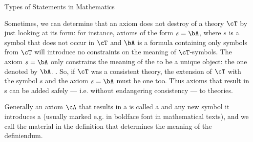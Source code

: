 \begin{omgroup}[id=statements-constitutive]{Types of Statements in Mathematics}
\begin{module}[id=statementtypes]
\begin{omtext}
  Sometimes, we can determine that an axiom does not destroy {} of a
  theory $\cT$ by just looking at its form: for instance, axioms of the form $s=\bA$,
  where $s$ is a symbol that does not occur in $\cT$ and $\bA$ is a formula containing
  only symbols from $\cT$ will introduce no constraints on the meaning of
  $\cT$-symbols. The axiom $s=\bA$ only constrains the meaning of the
  {} to be a unique object: the one denoted by $\bA$. . So, if $\cT$ was a
  consistent theory, the extension of $\cT$ with the symbol $s$ and the axiom $s=\bA$ must
  be one too. Thus axioms that result in {s} can be added
  safely --- i.e. without endangering consistency --- to theories.
\end{omtext}

\begin{definition}[display=flow,id=conservative-extension.def]
  Generally an axiom $\cA$ that results in a {} is called
  a  and any new symbol it introduces a  (usually
  marked e.g. in boldface font in mathematical texts), and we call  the
  material in the definition that determines the meaning of the definiendum.
\end{definition}
\end{module}
\end{omgroup}

